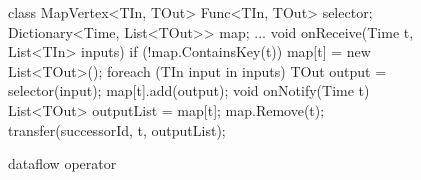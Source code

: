 \begin{figure}[t!]
\begin{numcodejava}
class MapVertex<TIn, TOut> {
  Func<TIn, TOut> selector;
  Dictionary<Time, List<TOut>> map;
  ...
  void onReceive(Time t, List<TIn> inputs) {
    if (!map.ContainsKey(t))
       map[t] = new List<TOut>();
    foreach (TIn input in inputs) {
      TOut output = selector(input);
      map[t].add(output);
    }
  }
  void onNotify(Time t) {
     List<TOut> outputList = map[t];
     map.Remove(t);
     transfer(successorId, t, outputList); 
  }
}
\end{numcodejava}
\caption{ dataflow operator}
\label{fig:motivating-eg}
\end{figure}
